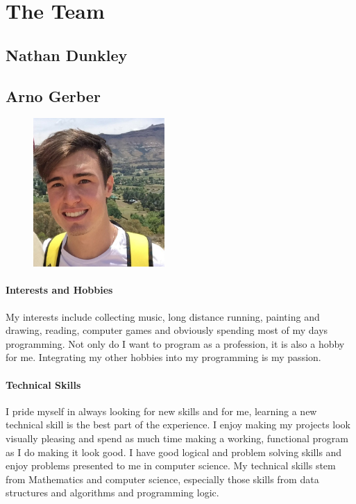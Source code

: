 \documentclass[english]{article}
\begin{document}
	\section{The Team}
		\subsection{Nathan Dunkley}
		
		\subsection{Arno Gerber}
		\begin{figure}
			\begin{center}
				\includegraphics[width=5cm]{arno.jpg}
			\end{center}
		\end{figure}
		\paragraph{Interests and Hobbies}
		My interests include collecting music, long distance running, painting and drawing, reading, computer games and obviously spending most of my days programming. Not only do I want to program as a profession, it is also a hobby for me. Integrating my other hobbies into my programming is my passion.
		
		\paragraph{Technical Skills}
		I pride myself in always looking for new skills and for me, learning a new technical skill is the best part of the experience. I enjoy making my projects look visually pleasing and spend as much time making a working, functional program as I do making it look good. I have good logical and problem solving skills and enjoy problems presented to me in computer science. My technical skills stem from Mathematics and computer science, especially those skills from data structures and algorithms and programming logic.
		
\end{document}
